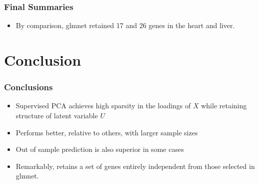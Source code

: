 \documentclass[11pt]{beamer}
\begin{document}
\begin{frame}
\frametitle{Final Summaries}
{
\begin{itemize}
\item By comparison, glmnet retained 17 and 26 genes in the heart and liver.

\end{itemize}
\begin{table}[ht]
\centering
{}
\caption{glmnet in Heart and Liver (17 and 16 samples, respectively)}
\end{table}

}
\end{frame}


\section{Conclusion}
\begin{frame}
\frametitle{Conclusions}
{
\begin{itemize}
\item Supervised PCA achieves high sparsity in the loadings of $X$ while retaining structure of latent variable $U$
\item Performs better, relative to others, with larger sample sizes
\item Out of sample prediction is also superior in some cases
\item Remarkably, retains a set of genes entirely independent from those selected in glmnet.
\end{itemize}
}
\end{frame}
\end{document}
